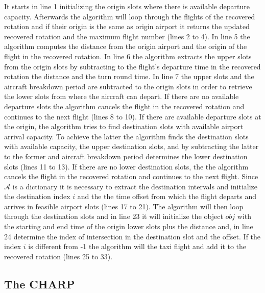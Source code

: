 It starts in line 1  initializing the origin slots where there is available departure capacity. Afterwards the algorithm will loop through the flights of the recovered rotation  and if their origin is the same as origin airport it returns the updated recovered rotation and the maximum flight number (lines 2 to 4). In line 5 the algorithm computes the distance from the origin airport and the origin of the flight in the recovered rotation. In line 6 the algorithm extracts the upper slots from the origin slots by subtracting to the flight's departure time in the recovered rotation the distance and the turn round time. In line 7 the upper slots and the aircraft breakdown period are subtracted to the origin slots in order to retrieve the lower slots from where the aircraft can depart. If there are no available departure slots the algorithm cancels the flight in the recovered rotation and continues to the next flight (lines 8 to 10). If there are available departure slots at the origin, the algorithm tries to find destination slots with available airport arrival capacity. To achieve the latter the algorithm finds the destination slots with available capacity, the upper destination slots, and by subtracting the latter to the former and aircraft breakdown period determines the lower destination slots (lines 11 to 13). If there are no lower destination slots, the the algorithm cancels the flight in the recovered rotation and continues to the next flight. Since $\mathcal{A}$ is a dictionary it is necessary to extract the destination intervals and initialize the destination index $i$ and the the time offset from which the flight departs and arrives in feasible airport slots (lines 17 to 21). The algorithm will then loop through the destination slots and in line 23 it will initialize the object $obj$ with the starting and end time of the origin lower slots plus the distance and, in line 24 determine the index of intersection in the destination slot and the offset. If the index $i$ is different from -1 the algorithm will the taxi flight and add it to the recovered rotation (lines 25 to 33).\\ 

\subsection{The CHARP} \label{sec:charp}

